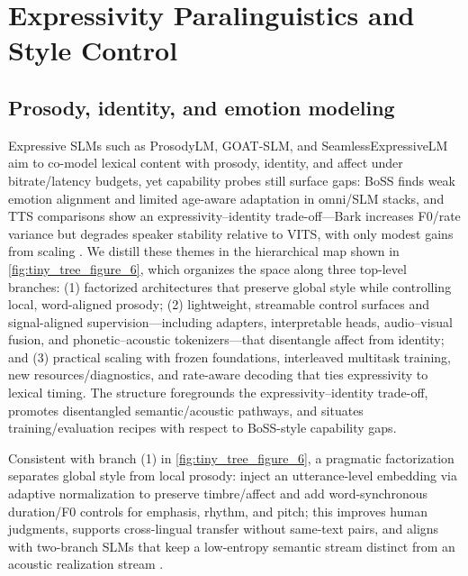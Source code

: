 \documentclass{article}
\begin{document}
\section{Expressivity Paralinguistics and Style Control} \label{sec:Expressivity Paralinguistics and Style Control}

\subsection{Prosody, identity, and emotion modeling} \label{subsec:Prosody, identity, and emotion modeling}
Expressive SLMs such as ProsodyLM, GOAT-SLM, and SeamlessExpressiveLM aim to co-model lexical content with prosody, identity, and affect under bitrate/latency budgets, yet capability probes still surface gaps: BoSS finds weak emotion alignment and limited age-aware adaptation in omni/SLM stacks, and TTS comparisons show an expressivity--identity trade-off---Bark increases F0/rate variance but degrades speaker stability relative to VITS, with only modest gains from scaling \cite{wang2025bossbeyondsemanticspeech,wang2024evaluatingtextspeechsynthesislargediscre}. We distill these themes in the hierarchical map shown in \autoref{fig:tiny_tree_figure_6}, which organizes the space along three top-level branches: (1) factorized architectures that preserve global style while controlling local, word-aligned prosody; (2) lightweight, streamable control surfaces and signal-aligned supervision---including adapters, interpretable heads, audio--visual fusion, and phonetic--acoustic tokenizers---that disentangle affect from identity; and (3) practical scaling with frozen foundations, interleaved multitask training, new resources/diagnostics, and rate-aware decoding that ties expressivity to lexical timing. The structure foregrounds the expressivity--identity trade-off, promotes disentangled semantic/acoustic pathways, and situates training/evaluation recipes with respect to BoSS-style capability gaps.

Consistent with branch (1) in \autoref{fig:tiny_tree_figure_6}, a pragmatic factorization separates global style from local prosody: inject an utterance-level embedding via adaptive normalization to preserve timbre/affect and add word-synchronous duration/F0 controls for emphasis, rhythm, and pitch; this improves human judgments, supports cross-lingual transfer without same-text pairs, and aligns with two-branch SLMs that keep a low-entropy semantic stream distinct from an acoustic realization stream \cite{huang2023holisticcascadesystembenchmarkhumanevalu}. 
\end{document}
